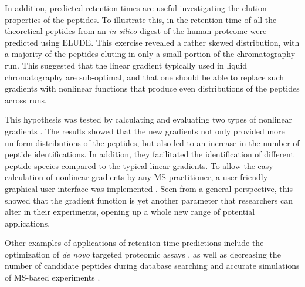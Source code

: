 \documentclass[a4paper]{article}
\begin{document}
In addition, predicted retention times are useful investigating the
elution properties of the peptides.  To illustrate this, in
\cite{elude1} the retention time of all the theoretical peptides from
an {\it in silico} digest of the human proteome were predicted using
{\sc ELUDE}. This exercise revealed a rather skewed distribution, with
a majority of the peptides eluting in only a small portion of the
chromatography run. This suggested that the linear gradient typically
used in liquid chromatography are sub-optimal, and that one should be
able to replace such gradients with nonlinear functions that produce
even distributions of the peptides across runs.

This hypothesis was tested by calculating and evaluating two types of
nonlinear gradients \cite{gradopt1}. The results showed that the new
gradients not only provided more uniform distributions of the
peptides, but also led to an increase in the number of peptide
identifications. In addition, they facilitated the identification of
different peptide species compared to the typical linear gradients. To
allow the easy calculation of nonlinear gradients by any MS
practitioner, a user-friendly graphical user interface was implemented 
\cite{gradopt2}.  Seen from a general perspective, this showed that
the gradient function is yet another parameter that researchers can
alter in their experiments, opening up a whole new range of potential
applications.

Other examples of applications of retention time predictions include
the optimization of {\em de novo} targeted proteomic assays
\cite{bertsch2010}, as well as decreasing the number of candidate
peptides during database searching \cite{lobas2013} and accurate
simulations of MS-based experiments \cite{bielow2011}.



 
\end{document}
